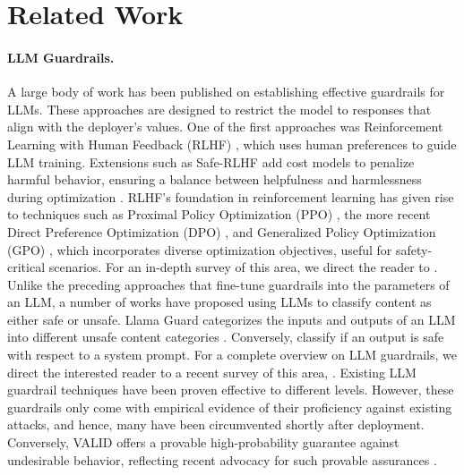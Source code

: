 \section{Related Work}
\paragraph{LLM Guardrails.}
A large body of work has been published on establishing effective guardrails for LLMs. These approaches are designed to restrict the model to responses that align with the deployer's values. One of the first approaches was Reinforcement Learning with Human Feedback (RLHF) \citep{askell_general_2021}, which uses human preferences to guide LLM training.
Extensions such as Safe-RLHF add cost models to penalize harmful behavior, ensuring a balance between helpfulness and harmlessness during optimization \citep{dai_safe_2024}.
RLHF's foundation in reinforcement learning has given rise to techniques such as Proximal Policy Optimization (PPO) \citep{bai_training_2022}, the more recent Direct Preference Optimization (DPO) \citep{rafailov_direct_2024},
and Generalized Policy Optimization (GPO) \citep{tang_generalized_2024}, which incorporates diverse optimization objectives, useful for safety-critical scenarios.
For an in-depth survey of this area, we direct the reader to \citet{kaufmann_survey_2024}.
Unlike the preceding approaches that fine-tune guardrails into the parameters of an LLM, a number of works have proposed using LLMs to classify content as either safe or unsafe.
Llama Guard categorizes the inputs and outputs of an LLM into different unsafe content categories \citep{inan_llama_2023}. Conversely, \citet{chua_flexible_2024} classify if an output is safe with respect to a system prompt.
For a complete overview on LLM guardrails, we direct the interested reader to a recent survey of this area, \citet{dong_safeguarding_2024}.
Existing LLM guardrail techniques have been proven effective to different levels. However, these guardrails only come with empirical evidence of their proficiency against existing attacks, and hence, many have been circumvented shortly after deployment. Conversely, VALID offers a provable high-probability guarantee against undesirable behavior, reflecting recent advocacy for such provable assurances \citep{bengio_bounding_2024}.

